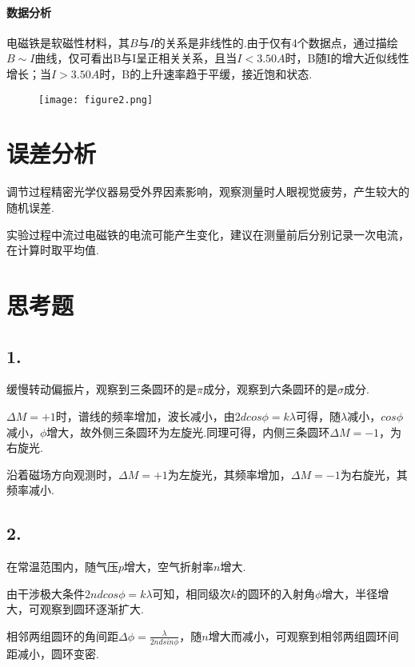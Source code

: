 \documentclass{thureport}
\begin{document}
\paragraph{数据分析}
电磁铁是软磁性材料，其$B$与$I$的关系是非线性的.由于仅有4个数据点，通过描绘$B\sim I$曲线，仅可看出B与I呈正相关关系，且当$I<3.50A$时，B随I的增大近似线性增长；当$I>3.50A$时，B的上升速率趋于平缓，接近饱和状态.

\begin{figure}[h]
    \centering
    \texttt{[image: figure2.png]}
\end{figure}

\section{误差分析}
\begin{clause}
	\item 调节过程精密光学仪器易受外界因素影响，观察测量时人眼视觉疲劳，产生较大的随机误差.
	\item 实验过程中流过电磁铁的电流可能产生变化，建议在测量前后分别记录一次电流，在计算时取平均值.
\end{clause}


\section{思考题}
\subsection*{1.}
缓慢转动偏振片，观察到三条圆环的是$\pi$成分，观察到六条圆环的是$\sigma$成分.

$\Delta M=+1$时，谱线的频率增加，波长减小，由$2dcos\phi=k\lambda$可得，随$\lambda$减小，$cos\phi$减小，$\phi$增大，故外侧三条圆环为左旋光.同理可得，内侧三条圆环$\Delta M=-1$，为右旋光.

沿着磁场方向观测时，$\Delta M=+1$为左旋光，其频率增加，$\Delta M=-1$为右旋光，其频率减小.

\subsection*{2.}
在常温范围内，随气压$p$增大，空气折射率$n$增大.

由干涉极大条件$2ndcos\phi=k\lambda$可知，相同级次$k$的圆环的入射角$\phi$增大，半径增大，可观察到圆环逐渐扩大.

相邻两组圆环的角间距$\Delta\phi=\frac{\lambda}{2ndsin\phi}$，随$n$增大而减小，可观察到相邻两组圆环间距减小，圆环变密.
\end{document}
